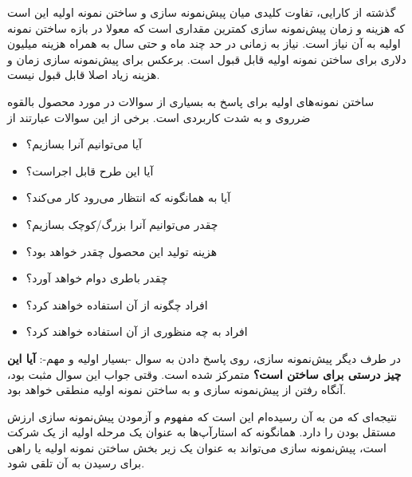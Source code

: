 گذشته از کارایی، تفاوت کلیدی میان پیش‌نمونه سازی و ساختن نمونه اولیه این
است که هزینه و زمان پیش‌نمونه سازی کمترین مقداری است که معولا در بازه
ساختن نمونه اولیه به آن نیاز است. نیاز به زمانی در حد چند ماه و حتی سال
به همراه هزینه میلیون دلاری برای ساختن نمونه اولیه قابل قبول است. برعکس
برای پیش‌نمونه سازی زمان و هزینه زیاد اصلا قابل قبول نیست.

ساختن نمونه‌های اولیه برای پاسخ به بسیاری از سوالات در مورد محصول بالقوه
ضرروی و به شدت کاربردی است. برخی از این سوالات عبارتند از

\begin{itemize}

\item
  آیا می‌توانیم آنرا بسازیم؟
\item
  آیا این طرح قابل اجراست؟
\item
  آیا به همانگونه که انتظار می‌رود کار می‌کند؟
\item
  چقدر می‌توانیم آنرا بزرگ/کوچک بسازیم؟
\item
  هزینه تولید این محصول چقدر خواهد بود؟
\item
  چقدر باطری دوام خواهد آورد؟
\item
  افراد چگونه از آن استفاده خواهند کرد؟
\item
  افراد به چه منظوری از آن استفاده خواهند کرد؟
\end{itemize}

در طرف دیگر پیش‌نمونه سازی، روی پاسخ دادن به سوال -بسیار اولیه و مهم-:
\textbf{آیا این چیز درستی برای ساختن است؟} متمرکز شده است. وقتی جواب این
سوال مثبت بود، آنگاه رفتن از پیش‌نمونه سازی و به ساختن نمونه اولیه منطقی
خواهد بود.

نتیجه‌ای که من به آن رسیده‌ام این است که مفهوم و آزمودن پیش‌نمونه سازی
ارزش مستقل بودن را دارد. همانگونه که استارآپ‌ها به عنوان یک مرحله اولیه
از یک شرکت است، پیش‌نمونه سازی می‌تواند به عنوان یک زیر بخش ساختن نمونه
اولیه یا راهی برای رسیدن به آن تلقی شود.
